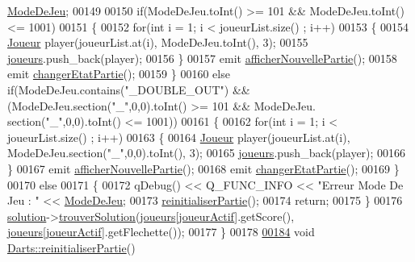 \begin{DoxyCode}
      \hyperlink{class_darts_a281fd6201343dfb65ab81c93fd60f786}{ModeDeJeu};
00149 
00150     \textcolor{keywordflow}{if}(ModeDeJeu.toInt() >= 101 && ModeDeJeu.toInt() <= 1001)
00151     \{
00152         \textcolor{keywordflow}{for}(\textcolor{keywordtype}{int} i = 1; i < joueurList.size() ; i++)
00153         \{
00154             \hyperlink{class_joueur}{Joueur} player(joueurList.at(i), ModeDeJeu.toInt(), 3);
00155             \hyperlink{class_darts_a81bc116f3ae70cea1f492f87f01901c7}{joueurs}.push\_back(player);
00156         \}
00157         emit \hyperlink{class_darts_a650d6efdef25756bfbbacb0bb3549c43}{afficherNouvellePartie}();
00158         emit \hyperlink{class_darts_a25cf64530c84d7aa261a4806e88dcd6e}{changerEtatPartie}();
00159     \}
00160     \textcolor{keywordflow}{else} \textcolor{keywordflow}{if}(ModeDeJeu.contains(\textcolor{stringliteral}{"\_DOUBLE\_OUT"}) && (ModeDeJeu.section(\textcolor{stringliteral}{"\_"},0,0).toInt() >= 101 && ModeDeJeu.
      section(\textcolor{stringliteral}{"\_"},0,0).toInt() <= 1001))
00161     \{
00162         \textcolor{keywordflow}{for}(\textcolor{keywordtype}{int} i = 1; i < joueurList.size() ; i++)
00163         \{
00164             \hyperlink{class_joueur}{Joueur} player(joueurList.at(i), ModeDeJeu.section(\textcolor{stringliteral}{"\_"},0,0).toInt(), 3);
00165             \hyperlink{class_darts_a81bc116f3ae70cea1f492f87f01901c7}{joueurs}.push\_back(player);
00166         \}
00167         emit \hyperlink{class_darts_a650d6efdef25756bfbbacb0bb3549c43}{afficherNouvellePartie}();
00168         emit \hyperlink{class_darts_a25cf64530c84d7aa261a4806e88dcd6e}{changerEtatPartie}();
00169     \}
00170     \textcolor{keywordflow}{else}
00171     \{
00172         qDebug() << Q\_FUNC\_INFO << \textcolor{stringliteral}{"Erreur Mode De Jeu : "} << \hyperlink{class_darts_a281fd6201343dfb65ab81c93fd60f786}{ModeDeJeu};
00173         \hyperlink{class_darts_a70c68ed8bd56b63df203c25e6ed14f3b}{reinitialiserPartie}();
00174         \textcolor{keywordflow}{return};
00175     \}
00176     \hyperlink{class_darts_a40733010dc6ae4ce93140804b4d191ea}{solution}->\hyperlink{class_solution_a9ab0b0fd2b557f5abda8bd1a6da641e4}{trouverSolution}(\hyperlink{class_darts_a81bc116f3ae70cea1f492f87f01901c7}{joueurs}[\hyperlink{class_darts_a68fb01b9aad6502e4429dfbf2a72d50b}{joueurActif}].getScore(),
      \hyperlink{class_darts_a81bc116f3ae70cea1f492f87f01901c7}{joueurs}[\hyperlink{class_darts_a68fb01b9aad6502e4429dfbf2a72d50b}{joueurActif}].getFlechette());
00177 \}
00178 
\hyperlink{class_darts_a70c68ed8bd56b63df203c25e6ed14f3b}{00184} \textcolor{keywordtype}{void} \hyperlink{class_darts_a70c68ed8bd56b63df203c25e6ed14f3b}{Darts::reinitialiserPartie}()

\end{DoxyCode}
